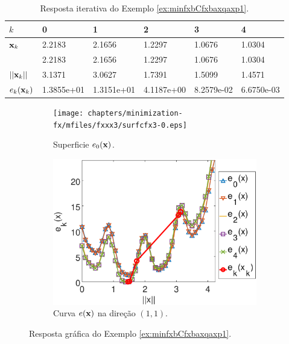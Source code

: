 \begin{table}[h!]
\centering
\begin{tabular}{|l|l|l|l|l|l|}
\hline
$k$ & 0 & 1 & 2 & 3 & 4 \\ \hline
$\VECTOR{x}_k$ & 2.2183 & 2.1656 & 1.2297 & 1.0676 & 1.0304 \\ 
~              & 2.2183 & 2.1656 & 1.2297 & 1.0676 & 1.0304 \\ \hline
$||\VECTOR{x}_k||$ & 3.1371 & 3.0627 & 1.7391 & 1.5099 & 1.4571 \\ \hline
$e_{k}(\VECTOR{x}_k)$ & 1.3855e+01 & 1.3151e+01 & 4.1187e+00 & 8.2579e-02 & 6.6750e-03 \\ \hline
\end{tabular}
\caption{Resposta iterativa do Exemplo \ref{ex:minfxbCfxbaxqaxp1}.}
\label{table:ex:minfxbCfxbaxqaxp3}
\end{table}
\begin{figure}[h!]
     \centering
     \begin{subfigure}[b]{0.49\textwidth}
         \centering
         \texttt{[image: chapters/minimization-fx/mfiles/fxxx3/surfcfx3-0.eps]}
         \caption{Superficie $e_0(\VECTOR{x})$.}
         \label{fig:ex:minfxbCfxbaxqaxp3:a}
     \end{subfigure}
     \hfill
     \begin{subfigure}[b]{0.49\textwidth}
         \centering
         \includegraphics[width=0.98\textwidth]{chapters/minimization-fx/mfiles/fxxx3/plotfx3all.eps}
         \caption{Curva $e(\VECTOR{x})$ na direção $(1,1)$.}
         \label{fig:ex:minfxbCfxbaxqaxp3:b}
     \end{subfigure}
        \caption{Resposta gráfica do Exemplo \ref{ex:minfxbCfxbaxqaxp1}. }
        \label{fig:ex:minfxbCfxbaxqaxp3}
\end{figure}


